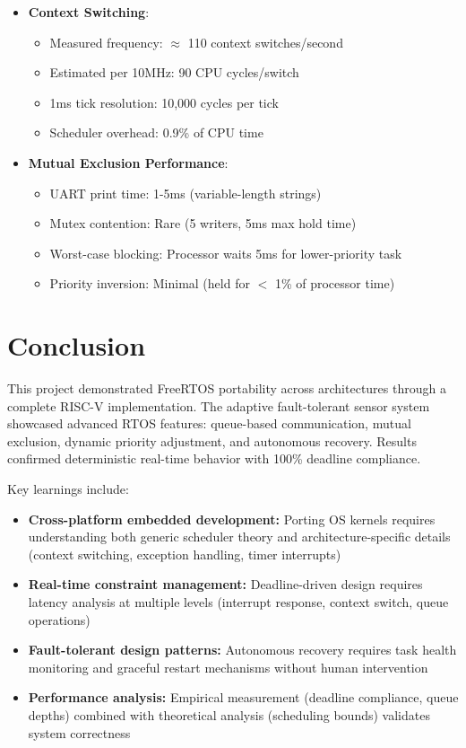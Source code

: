 \documentclass[conference]{IEEEtran}
\begin{document}
\begin{itemize}
    \item \textbf{Context Switching}:
    \begin{itemize}
        \item Measured frequency: \(\approx\) 110 context switches/second
        \item Estimated per 10MHz: 90 CPU cycles/switch
        \item 1ms tick resolution: 10,000 cycles per tick
        \item Scheduler overhead: 0.9\% of CPU time
    \end{itemize}
    
    \item \textbf{Mutual Exclusion Performance}:
    \begin{itemize}
        \item UART print time: 1-5ms (variable-length strings)
        \item Mutex contention: Rare (5 writers, 5ms max hold time)
        \item Worst-case blocking: Processor waits 5ms for lower-priority task
        \item Priority inversion: Minimal (held for \(<\) 1\% of processor time)
    \end{itemize}
\end{itemize}

\section{Conclusion}

This project demonstrated FreeRTOS portability across architectures through a complete RISC-V implementation. The adaptive fault-tolerant sensor system showcased advanced RTOS features: queue-based communication, mutual exclusion, dynamic priority adjustment, and autonomous recovery. Results confirmed deterministic real-time behavior with 100\% deadline compliance.

Key learnings include:
\begin{itemize}
    \item \textbf{Cross-platform embedded development:} Porting OS kernels requires understanding both generic scheduler theory and architecture-specific details (context switching, exception handling, timer interrupts)
    \item \textbf{Real-time constraint management:} Deadline-driven design requires latency analysis at multiple levels (interrupt response, context switch, queue operations)
    \item \textbf{Fault-tolerant design patterns:} Autonomous recovery requires task health monitoring and graceful restart mechanisms without human intervention
    \item \textbf{Performance analysis:} Empirical measurement (deadline compliance, queue depths) combined with theoretical analysis (scheduling bounds) validates system correctness
\end{itemize}
\end{document}
